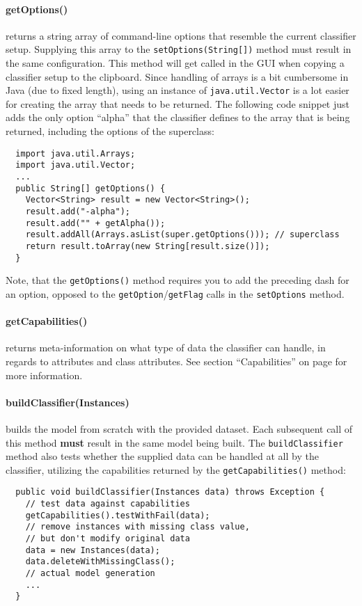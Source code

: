\paragraph{getOptions()} returns a string array of command-line options that
resemble the current classifier setup. Supplying this array to the
\texttt{setOptions(String[])} method must result in the same configuration.
This method will get called in the GUI when copying a classifier setup to the
clipboard. Since handling of arrays is a bit cumbersome in Java (due to fixed
length), using an instance of \texttt{java.util.Vector} is a lot easier for
creating the array that needs to be returned. The following code snippet just
adds the only option ``alpha'' that the classifier defines to the array that is
being returned, including the options of the superclass:
\begin{verbatim}
  import java.util.Arrays;
  import java.util.Vector;
  ...
  public String[] getOptions() {
    Vector<String> result = new Vector<String>();
    result.add("-alpha");
    result.add("" + getAlpha());
    result.addAll(Arrays.asList(super.getOptions())); // superclass
    return result.toArray(new String[result.size()]);
  }
\end{verbatim}
Note, that the \texttt{getOptions()} method requires you to add the preceding
dash for an option, opposed to the \texttt{getOption}/\texttt{getFlag} calls in
the \texttt{setOptions} method.

\paragraph{getCapabilities()} returns meta-information on what type of data the
classifier can handle, in regards to attributes and class attributes. See
section ``Capabilities'' on page \pageref{classifier_capabilities} for more
information.

\paragraph{buildClassifier(Instances)} builds the model from scratch with the
provided dataset. Each subsequent call of this method \textbf{must} result in
the same model being built. The \texttt{buildClassifier} method also tests
whether the supplied data can be handled at all by the classifier, utilizing
the capabilities returned by the \texttt{getCapabilities()} method:
\begin{verbatim}
  public void buildClassifier(Instances data) throws Exception {
    // test data against capabilities
    getCapabilities().testWithFail(data);
    // remove instances with missing class value,
    // but don't modify original data
    data = new Instances(data);
    data.deleteWithMissingClass();
    // actual model generation
    ...
  }
\end{verbatim}

